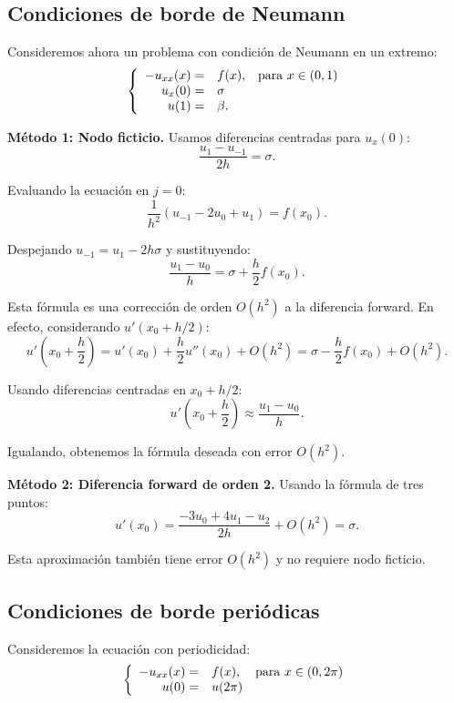 \documentclass[a4paper,11pt]{report}
\begin{document}
\subsection{Condiciones de borde de Neumann}

Consideremos ahora un problema con condición de Neumann en un extremo:
\begin{equation}
\label{laplaciano_neumann}
\left\lbrace
  \begin{array}{r l c}
      -u_{xx}(x) = & f(x), & \mbox{para } x \in (0,1) \\
      u_x(0) = & \sigma & \\
      u(1) = & \beta. &
      \end{array}
    \right.
\end{equation}

\textbf{Método 1: Nodo ficticio.} Usamos diferencias centradas para $u_x(0)$:
\[
\frac{u_1 - u_{-1}}{2h} = \sigma.
\]

Evaluando la ecuación en $j=0$:
\[
\frac{1}{h^2} \left( u_{-1} - 2u_{0} + u_{1} \right) = f(x_0).
\]

Despejando $u_{-1} = u_1 - 2h\sigma$ y sustituyendo:
\[
\frac{u_1 - u_0}{h} = \sigma + \frac{h}{2} f(x_0).
\]

Esta fórmula es una corrección de orden $O(h^2)$ a la diferencia forward. En efecto, considerando $u'(x_0 + h/2)$:
\[
u'\left(x_0 + \frac{h}{2}\right) = u'(x_0) + \frac{h}{2} u''(x_0) + O(h^2) = \sigma - \frac{h}{2} f(x_0) + O(h^2).
\]

Usando diferencias centradas en $x_0 + h/2$:
\[
u'\left(x_0 + \frac{h}{2}\right) \approx \frac{u_1 - u_0}{h}.
\]

Igualando, obtenemos la fórmula deseada con error $O(h^2)$.

\textbf{Método 2: Diferencia forward de orden 2.} Usando la fórmula de tres puntos:
\[
u'(x_0) = \frac{-3u_0 + 4u_1 - u_2}{2h} + O(h^2) = \sigma.
\]

Esta aproximación también tiene error $O(h^2)$ y no requiere nodo ficticio.

\subsection{Condiciones de borde periódicas}

Consideremos la ecuación con periodicidad:
\begin{equation}
\label{laplaciano_periodico}
\left\lbrace
  \begin{array}{r l c}
      -u_{xx}(x) = & f(x), & \mbox{para } x \in (0,2\pi) \\
      u(0) = & u(2\pi) &
      \end{array}
    \right.
\end{equation}
\end{document}

